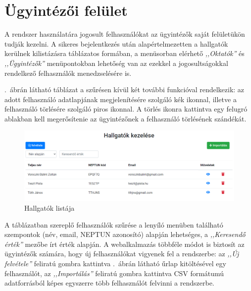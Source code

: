 \documentclass[
]{thesis-ekf}
\theoremstyle{definition}
\theoremstyle{remark}
\begin{document}
	\section{Ügyintézői felület}
	A rendszer használatára jogosult felhasználókat az ügyintézők saját felületükön tudják kezelni. A sikeres bejelentkezés után alapértelmezetten a hallgatók kerülnek kilistázásra táblázatos formában, a menüsorban elérhető \emph{,,Oktatók''} és \emph{,,Ügyintézők''} menüpontokban lehetőség van az ezekkel a jogosultságokkal rendelkező felhasználók menedzselésére is.
	
	\Az{\ref{fig:ugyint_hallgatok}}.~ábrán látható táblázat a szűrésen kívül két további funkcióval rendelkezik: az adott felhasználó adatlapjának megjelenítésére szolgáló kék ikonnal, illetve a felhasználó törlésére szolgáló piros ikonnal. A törlés ikonra kattintva egy felugró ablakban kell megerősítenie az ügyintézőnek a felhasználó törlésének szándékát.
	
	\begin{figure}[!h]
		\centering
		\includegraphics[width=15cm]{kepek/screenshots/ugyintezo_hallgatok.png}
		\caption{Hallgatók listája}
		\label{fig:ugyint_hallgatok}
	\end{figure}
	
	A táblázatban szereplő felhasználók szűrése a lenyíló menüben található szempontok (név, email, NEPTUN azonosító) alapján lehetséges, a \emph{,,Keresendő érték''} mezőbe írt érték alapján. A webalkalmazás többféle módot is biztosít az ügyintézők számára, hogy új felhasználókat vigyenek fel a rendszerbe: az \emph{,,Új felvétele''} feliratú gombra kattintva \az{\ref{fig:ugyint_felhasznalo_form}}.~ábrán látható űrlap kitöltésével egy felhasználót, az \emph{,,Importálás''} feliratú gombra kattintva CSV formátumú adatforrásból képes egyszerre több felhasználót felvinni a rendszerbe. 
	
\end{document}
